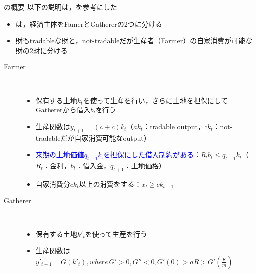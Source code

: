 \documentclass[aspectratio=169, dvipdfmx, 11pt, uplatex]{beamer}
\begin{document}
\begin{frame}{\textcite{KM1997}の概要}
以下の説明は\textcite{S2020}，\textcite{W2010}を参考にした
  \begin{itemize}
    \item \textcite{KM1997}は，経済主体をFamerとGathererの2つに分ける
    \item 財もtradableな財と，not-tradableだが生産者（Farmer）の自家消費が可能な財の2財に分ける
  \end{itemize}
  \begin{description}
    \item[Farmer] \mbox{} \\
      \begin{itemize}
        \item 保有する土地$k_t$を使って生産を行い，さらに土地を担保にしてGathererから借入$b_t$を行う \\
        \item 生産関数は$y_{t+1}=(a+c)k_t$（$ak_t$：tradable output，$ck_t$：not-tradableだが自家消費可能なoutput） \\
        \item \textcolor{blue}{来期の土地価値$q_{t+1} k_t$を担保にした借入制約がある}：$R_t b_t \leq q_{t+1} k_t$（$R_t$：金利，$b_t$：借入金，$q_{t+1}$：土地価格） \\
        \item 自家消費分$ck_{t}$以上の消費をする：$x_t \geq c k_{t-1}$
      \end{itemize}
    \item[Gatherer] \mbox{} \\
      \begin{itemize}
        \item 保有する土地$k'_t$を使って生産を行う \\
        \item 生産関数は$y'_{t-1}=G(k'_t), where \, G'>0, G''<0, G'(0)>aR>G'(\frac{\bar{K}}{m})$
      \end{itemize} 
  \end{description}
\end{frame}
\end{document}
